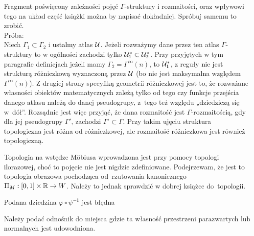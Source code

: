 \documentclass[a4paper,11pt]{article}
\begin{document}
\noindent
Fragment poświęcony zależności pojęć $\Gamma$-struktury i rozmaitości,
oraz wpływowi tego na układ część książki można by napisać dokładniej.
Spróbuj samemu to zrobić. \\
Próba: \\
Niech $\Gamma_{ 1 } \subset \Gamma_{ 2 }$ i ustalmy atlas
$\mathcal{U}$. Jeżeli rozważymy dane przez ten atlas
$\Gamma$-struktury to w ogólności zachodzi tylko
$\mathcal{U}^{ * }_{ 1 } \subset \mathcal{U}^{ * }_{ 2 }$. Przy
przyjętych w tym paragrafie definicjach jeżeli mamy
$\Gamma_{ 2 } = \Gamma^{ \infty }( n )$, to
$\mathcal{U}^{ * }_{ 1 }$, z reguły nie jest strukturą różniczkową
wyznaczoną przez $\mathcal{U}$ (bo nie jest maksymalna względem
$\Gamma^{ \infty }( n )$). Z drugiej strony specyfiką geometrii
różniczkowej jest to, że rozważane własności obiektów matematycznych
zależą tylko od tego czy funkcje przejścia danego atlasu należą do
danej pseudogrupy, z~tego też względu „dziedziczą się w~dół”.
Rozsądnie jest więc przyjąć, że dana rozmaitość jest
$\Gamma$-rozmaitością, gdy dla jej pseudogrupy $\Gamma'$, zachodzi
$\Gamma' \subset \Gamma$. Przy takim ujęciu struktura topologiczna
jest różna od różniczkowej, ale rozmaitość różniczkowa
jest również topologiczną.

\vspace{\spaceFour}





\noindent
{} Topologia na wstędze M\"{o}biusa wprowadzona jest przy pomocy
topologi ilorazowej, choć to pojęcie nie jest nigdzie zdefiniowane.
Podejrzewam, że jest to topologia obrazowa pochodząca od~rzutowania
kanonicznego $\Pi_{ M } : [ 0,1 ] \times \mathbb{R} \to W$. Należy to jednak
sprawdzić w dobrej książce do~topologii.

\vspace{\spaceFour}





\noindent
{} Podana dziedzina $\varphi \circ \psi^{ -1 }$ jest błędna 

\vspace{\spaceFour}





\noindent
{} Należy podać odnośnik do miejsca gdzie ta własność przestrzeni
parazwartych lub normalnych jest udowodniona.

\vspace{\spaceFour}
\end{document}
